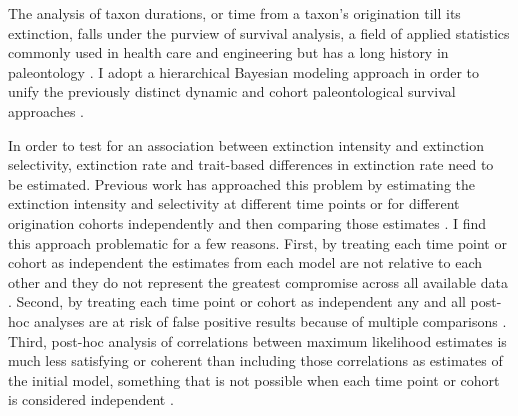 \documentclass[11pt]{article}
\begin{document}
The analysis of taxon durations, or time from a taxon's origination till its extinction, falls under the purview of survival analysis, a field of applied statistics commonly used in health care and engineering \citep{Klein2003} but has a long history in paleontology \citep{Simpson1944,Simpson1953,VanValen1973,VanValen1979,Smits2015,Crampton2016}. I adopt a hierarchical Bayesian modeling approach \citep{Gelman2007,Gelman2013d} in order to unify the previously distinct dynamic and cohort paleontological survival approaches \citep{VanValen1973,VanValen1979,Raup1978,Raup1975,Foote1988,Baumiller1993,Simpson2006,Crampton2016,Ezard2012b}. 

In order to test for an association between extinction intensity and extinction selectivity, extinction rate and trait-based differences in extinction rate need to be estimated. Previous work has approached this problem by estimating the extinction intensity and selectivity at different time points or for different origination cohorts independently and then comparing those estimates \citep{Payne2016}. I find this approach problematic for a few reasons. First, by treating each time point or cohort as independent the estimates from each model are not relative to each other and they do not represent the greatest compromise across all available data \citep{Gelman2013d}. Second, by treating each time point or cohort as independent any and all post-hoc analyses are at risk of false positive results because of multiple comparisons \citep{Gelman2013d}. Third, post-hoc analysis of correlations between maximum likelihood estimates is much less satisfying or coherent than including those correlations as estimates of the initial model, something that is not possible when each time point or cohort is considered independent \citep{Gelman2013d}. 

\end{document}
